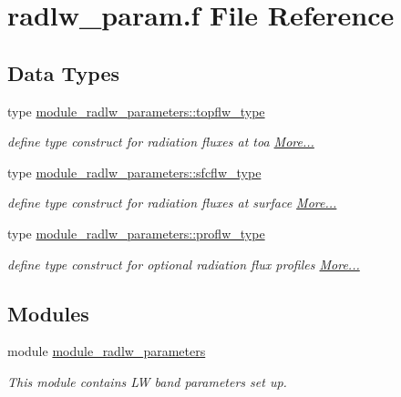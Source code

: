 \hypertarget{radlw__param_8f}{}\section{radlw\+\_\+param.\+f File Reference}
\label{radlw__param_8f}
\subsection*{Data Types}
\begin{DoxyCompactItemize}
\item 
type \hyperlink{namespacemodule__radlw__parameters_structmodule__radlw__parameters_1_1topflw__type}{module\+\_\+radlw\+\_\+parameters\+::topflw\+\_\+type}
\begin{DoxyCompactList}\small\item\em define type construct for radiation fluxes at toa  \hyperlink{namespacemodule__radlw__parameters_structmodule__radlw__parameters_1_1topflw__type}{More...}\end{DoxyCompactList}\item 
type \hyperlink{namespacemodule__radlw__parameters_structmodule__radlw__parameters_1_1sfcflw__type}{module\+\_\+radlw\+\_\+parameters\+::sfcflw\+\_\+type}
\begin{DoxyCompactList}\small\item\em define type construct for radiation fluxes at surface  \hyperlink{namespacemodule__radlw__parameters_structmodule__radlw__parameters_1_1sfcflw__type}{More...}\end{DoxyCompactList}\item 
type \hyperlink{namespacemodule__radlw__parameters_structmodule__radlw__parameters_1_1proflw__type}{module\+\_\+radlw\+\_\+parameters\+::proflw\+\_\+type}
\begin{DoxyCompactList}\small\item\em define type construct for optional radiation flux profiles  \hyperlink{namespacemodule__radlw__parameters_structmodule__radlw__parameters_1_1proflw__type}{More...}\end{DoxyCompactList}\end{DoxyCompactItemize}
\subsection*{Modules}
\begin{DoxyCompactItemize}
\item 
module \hyperlink{namespacemodule__radlw__parameters}{module\+\_\+radlw\+\_\+parameters}
\begin{DoxyCompactList}\small\item\em This module contains LW band parameters set up. \end{DoxyCompactList}\end{DoxyCompactItemize}
